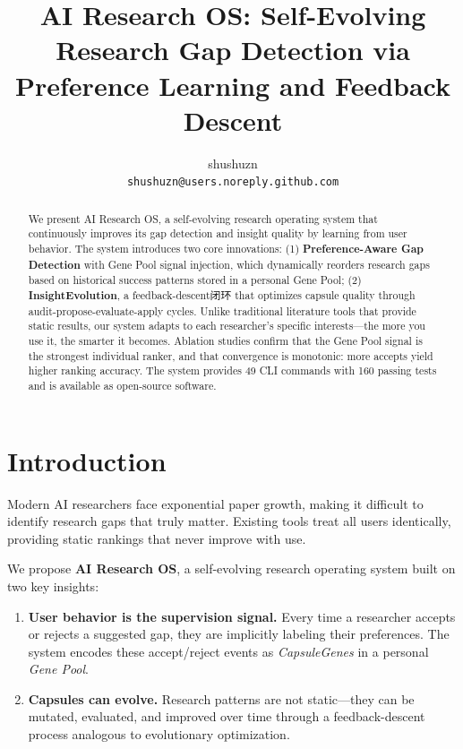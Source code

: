\documentclass[anon,9pt]{article}
\title{\textbf{AI Research OS: Self-Evolving Research Gap Detection via Preference Learning and Feedback Descent}}
\author{
  shushuzn \\
  \texttt{shushuzn@users.noreply.github.com}
}
\date{}
\begin{document}
\maketitle

\begin{abstract}
We present AI Research OS, a self-evolving research operating system that continuously improves its gap detection and insight quality by learning from user behavior. The system introduces two core innovations: (1) \textbf{Preference-Aware Gap Detection} with Gene Pool signal injection, which dynamically reorders research gaps based on historical success patterns stored in a personal Gene Pool; (2) \textbf{InsightEvolution}, a feedback-descent闭环 that optimizes capsule quality through audit-propose-evaluate-apply cycles. Unlike traditional literature tools that provide static results, our system adapts to each researcher's specific interests---the more you use it, the smarter it becomes. Ablation studies confirm that the Gene Pool signal is the strongest individual ranker, and that convergence is monotonic: more accepts yield higher ranking accuracy. The system provides 49 CLI commands with 160 passing tests and is available as open-source software.
\end{abstract}

\section{Introduction}

Modern AI researchers face exponential paper growth, making it difficult to identify research gaps that truly matter. Existing tools treat all users identically, providing static rankings that never improve with use.

We propose \textbf{AI Research OS}, a self-evolving research operating system built on two key insights:

\begin{enumerate}
    \item \textbf{User behavior is the supervision signal.} Every time a researcher accepts or rejects a suggested gap, they are implicitly labeling their preferences. The system encodes these accept/reject events as \textit{CapsuleGenes} in a personal \textit{Gene Pool}.
    \item \textbf{Capsules can evolve.} Research patterns are not static---they can be mutated, evaluated, and improved over time through a feedback-descent process analogous to evolutionary optimization.
\end{enumerate}
\end{document}
